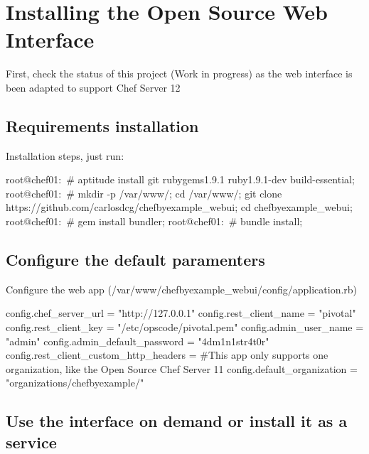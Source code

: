 \section{Installing the Open Source Web Interface}

First, check the status of this project (Work in progress) as 
the web interface is been adapted to support Chef Server 12

\subsection{Requirements installation}

Installation steps, just run:
\begin{codelisting}
\label{code:}
\codecaption{}
\begin{code}
root@chef01:~# aptitude install git rubygems1.9.1 ruby1.9.1-dev build-essential;
root@chef01:~# mkdir -p /var/www/; cd /var/www/; git clone https://github.com/carlosdcg/chefbyexample_webui; cd chefbyexample_webui;
root@chef01:~# gem install bundler;
root@chef01:~# bundle install;
\end{code}
\end{codelisting}

\subsection{Configure the default paramenters}

Configure the web app (/var/www/chefbyexample\_webui/config/application.rb)

\begin{codelisting}
\label{code:}
\codecaption{}
\begin{code}
config.chef_server_url = "http://127.0.0.1"
config.rest_client_name = "pivotal"
config.rest_client_key = "/etc/opscode/pivotal.pem"
config.admin_user_name =  "admin"
config.admin_default_password = "4dm1n1str4t0r"
config.rest_client_custom_http_headers = {}
#This app only supports one organization, like the Open Source Chef Server 11
config.default_organization = "organizations/chefbyexample/"
\end{code}
\end{codelisting}

\subsection{Use the interface on demand or install it as a service}


